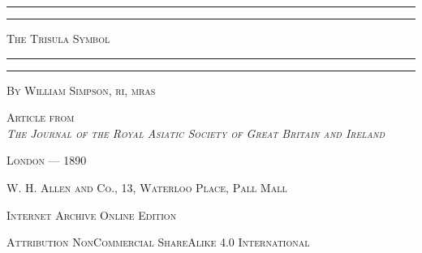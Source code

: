 \documentclass[a4paper, 11pt, oneside, english, landscape, twocolumn]{article}
\begin{document}
\begin{titlepage} %
	\centering %


	\rule{\textwidth}{1.6pt}\vspace*{-\baselineskip}\vspace*{2pt} %
	\rule{\textwidth}{0.4pt} %
	
	\vspace{1\baselineskip} %
	
	{\scshape\Huge The Trisula Symbol}
	
	\vspace{1\baselineskip} %

	\rule{\textwidth}{0.4pt}\vspace*{-\baselineskip}\vspace{3.2pt} %
	\rule{\textwidth}{1.6pt} %
	
	\vspace{1\baselineskip} %
	
	
        {\scshape By \Large William Simpson, \small ri, mras}
 
        \vspace{1.0\baselineskip}
		
        {\scshape \scriptsize Article from \\\emph{The Journal of the Royal Asiatic Society of Great Britain and Ireland}} %

        \vspace*{\fill}    

	\vspace{1\baselineskip}

        {\footnotesize\scshape London --- 1890}
	
	{\footnotesize\scshape{W. H. Allen and Co., 13, Waterloo Place, Pall Mall}}
	
	\vspace{0.25\baselineskip} %

        {\scshape\small Internet Archive Online Edition}%
    
	{\scshape\footnotesize Attribution NonCommercial ShareAlike 4.0 International } %
\end{titlepage}
\end{document}
